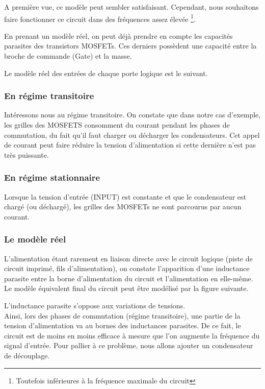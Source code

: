 
A première vue, ce modèle peut sembler satisfaisant. Cependant, nous souhaitons faire fonctionner ce circuit dans des fréquences assez élevée \footnote{Toutefois inférieures à la fréquence maximale du circuit}.

En prenant un modèle réel, on peut déjà prendre en compte les capacités parasites des transistors MOSFETs. Ces derniers possèdent une capacité entre la broche de commande (Gate) et la masse.

Le modèle réel des entrées de chaque porte logique est le suivant.



\subsubsection{En régime transitoire}
Intéressons nous au régime transitoire.
On constate que dans notre cas d'exemple, les grilles des  MOSFETS consomment du courant pendant les phases de commutation, du fait qu'il faut charger ou décharger les condensateurs.
Cet appel de courant peut faire réduire la tension d'alimentation si cette dernière n'est pas très puissante.


\subsubsection{En régime stationnaire}

Lorsque la tension d'entrée (INPUT) est constante et que le condensateur est chargé (ou déchargé), les grilles des MOSFETs ne sont parcourus par aucun courant.\\

\subsubsection{Le modèle réel}

L'alimentation étant rarement en liaison directe avec le circuit logique (piste de circuit imprimé, fils d'alimentation), on constate l'apparition d'une inductance parasite entre la borne d'alimentation du circuit et l'alimentation en elle-même.
Le modèle équivalent final du circuit peut être modélisé par la figure suivante.


L'inductance parasite s'oppose aux variations de tensions. \\ Ainsi, lors des phases de commutation (régime transitoire), une partie de la tension d'alimentation va au bornes des inductances parasites.
De ce fait, le circuit est de moins en moins efficace à mesure que l'on augmente la fréquence du signal d'entrée.
Pour pallier à ce problème, nous allons ajouter un condensateur de découplage.
